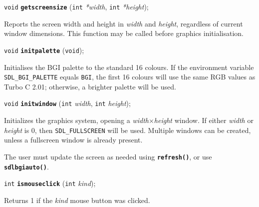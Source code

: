 \documentclass[a4paper,12pt]{article}
\newcommand{\V}{\texttt{void}}      %
\newcommand{\I}{\texttt{int}}       %
\newcommand{\func}[1]{\textbf{\texttt{#1}}}  %
\newcommand{\A}[1]{\emph{#1}}       %
\newcommand{\T}[1]{\texttt{#1}}     %
\newenvironment{bgi}
{ %
  \begin{snugshade}
}
{ %
  \end{snugshade}
}
\begin{document}
\label{sec:getscreensize}

\begin{bgi}
\V{} \func{getscreensize} (\I{} \A{*width}, \I{} \A{*height});
\end{bgi}

Reports the screen width and height in \A{width} and \A{height},
regardless of current window dimensions. This function may be called
before graphics initialisation.


\label{sec:initpalette}

\begin{bgi}
\V{} \func{initpalette} (\V{});
\end{bgi}

Initialises the BGI palette to the standard 16 colours. If the
environment variable \T{SDL\_BGI\-\_PALET\-TE} equals \T{BGI}, the
first 16 colours will use the same RGB values as Turbo C 2.01;
otherwise, a brighter palette will be used.


\label{sec:initwindow}

\begin{bgi}
\V{} \func{initwindow} (\I{} \A{width}, \I{} \A{height});
\end{bgi}

Initializes the graphics system, opening a \A{width}$\times$\A{height}
window. If either \A{width} or \A{height} is 0, then
\T{SDL\-\_FULL\-SCREEN} will be used. Multiple windows can be created,
unless a fullscreen window is already present.

The user must update the screen as needed using \func{refresh()}, or
use \func{sdlbgiauto()}.


\label{sec:ismouseclick}

\begin{bgi}
\I{} \func{ismouseclick} (\I{} \A{kind});
\end{bgi}

Returns 1 if the \A{kind} mouse button was clicked.


\label{sec:mouseclick}
\end{document}

